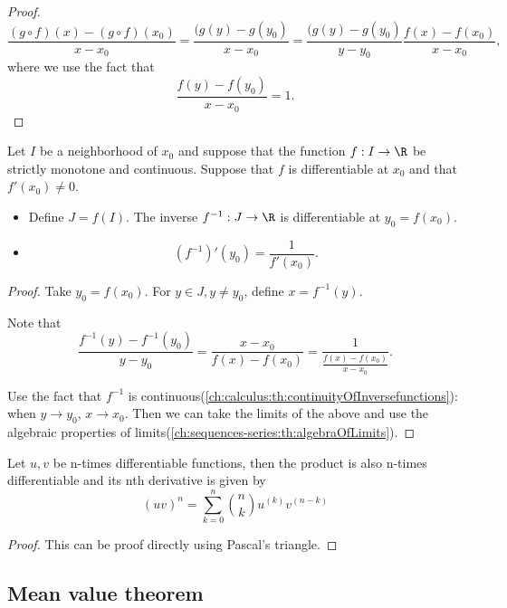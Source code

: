 \begin{refsection}
\begin{proof}
$$\frac{(g\circ f)(x) - (g\circ f)(x_0)}{x-x_0} = \frac{(g(y) - g(y_0)}{x-x_0} = \frac{(g(y) - g(y_0)}{y-y_0}\frac{f(x)-f(x_0)}{x-x_0},$$
where we use the fact that $$\frac{f(y)-f(y_0)}{x-x_0} = 1.$$
	
\end{proof}


\begin{lemma}\cite[97]{fitzpatrick2006advanced}
	Let $I$ be a neighborhood of $x_0$ and suppose that the function $f:I\to \R$ be strictly monotone and continuous. 
	Suppose that $f$ is differentiable at $x_0$ and that $f'(x_0)\neq 0$. 

	\begin{itemize}
		\item Define $J = f(I)$. The inverse $f^{-1}:J\to \R$ is differentiable at $y_0 = f(x_0)$. 
		\item
		$$(f^{-1})'(y_0) = \frac{1}{f'(x_0)}.$$
	\end{itemize}	
\end{lemma}
\begin{proof}
Take $y_0 = f(x_0)$. For $y\in J, y\neq y_0$, define $x = f^{-1}(y)$. 

Note that
$$\frac{f^{-1}(y) - f^{-1}(y_0)}{y-y_0} = \frac{x - x_0}{f(x)-f(x_0)} = \frac{1}{\frac{f(x)-f(x_0)}{x - x_0}}.$$

Use the fact that $f^{-1}$ is continuous(\autoref{ch:calculus:th:continuityOfInversefunctions}): when $y\to y_0$, $x\to x_0$. Then we can take the limits of the above and use the algebraic properties of limits(\autoref{ch:sequences-series:th:algebraOfLimits}).	
\end{proof}




\begin{lemma}
Let $u,v$ be n-times differentiable functions, then the product is also n-times differentiable and its nth derivative is given by
$$(uv)^{n} = \sum_{k=0}^n \binom{n}{k}u^{(k)}v^{(n-k)}$$
\end{lemma}
\begin{proof}
This can be proof directly using Pascal's triangle.
\end{proof}



\subsection{Mean value theorem}




\end{refsection}
